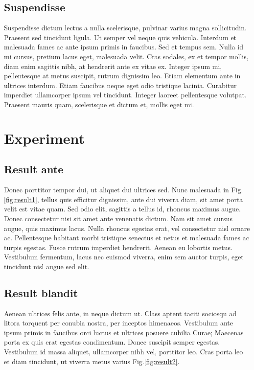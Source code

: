 \documentclass[11pt,oneside,openright]{book}
\begin{document}
\section{Suspendisse}

Suspendisse dictum lectus a nulla scelerisque, pulvinar varius magna sollicitudin. Praesent sed tincidunt ligula. Ut semper vel neque quis vehicula. Interdum et malesuada fames ac ante ipsum primis in faucibus. Sed et tempus sem. Nulla id mi cursus, pretium lacus eget, malesuada velit. Cras sodales, ex et tempor mollis, diam enim sagittis nibh, at hendrerit ante ex vitae ex. Integer ipsum mi, pellentesque at metus suscipit, rutrum dignissim leo. Etiam elementum ante in ultrices interdum. Etiam faucibus neque eget odio tristique lacinia. Curabitur imperdiet ullamcorper ipsum vel tincidunt. Integer laoreet pellentesque volutpat. Praesent mauris quam, scelerisque et dictum et, mollis eget mi.


\chapter{Experiment}\label{cpt:exp}

\section{Result ante}

Donec porttitor tempor dui, ut aliquet dui ultrices sed. Nunc malesuada in Fig.\ref{fig:result1}, tellus quis efficitur dignissim, ante dui viverra diam, sit amet porta velit est vitae quam. Sed odio elit, sagittis a tellus id, rhoncus maximus augue. Donec consectetur nisi sit amet ante venenatis dictum. Nam sit amet cursus augue, quis maximus lacus. Nulla rhoncus egestas erat, vel consectetur nisl ornare ac. Pellentesque habitant morbi tristique senectus et netus et malesuada fames ac turpis egestas. Fusce rutrum imperdiet hendrerit. Aenean eu lobortis metus. Vestibulum fermentum, lacus nec euismod viverra, enim sem auctor turpis, eget tincidunt nisl augue sed elit.


\section{Result blandit}

Aenean ultrices felis ante, in neque dictum ut. Class aptent taciti sociosqu ad litora torquent per conubia nostra, per inceptos himenaeos. Vestibulum ante ipsum primis in faucibus orci luctus et ultrices posuere cubilia Curae; Maecenas porta ex quis erat egestas condimentum. Donec suscipit semper egestas. Vestibulum id massa aliquet, ullamcorper nibh vel, porttitor leo. Cras porta leo et diam tincidunt, ut viverra metus varius Fig.\ref{fig:result2}.
\end{document}
